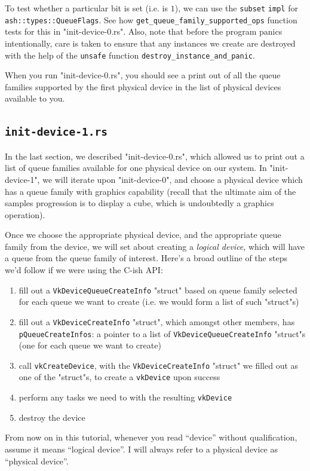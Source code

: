 \documentclass[12pt,letterpaper]{article}
\newcommand{\inquotes}[1]{``#1''}	%
\newcommand{\ril}[1]{\texttt{#1}}
\newcommand{\cil}[1]{\texttt{#1}}
\begin{document}
		To test whether a particular bit is set (i.e. is $1$), we can use the \ril{subset} \ril{impl} for \ril{ash::types::QueueFlags}. See how \ril{get_queue_family_supported_ops} function tests for this in "init-device-0.rs". Also, note that before the program panics intentionally, care is taken to ensure that any instances we create are destroyed with the help of the \ril{unsafe} function \ril{destroy_instance_and_panic}.
				
		When you run "init-device-0.rs", you should see a print out of all the queue families supported by the first physical device in the list of physical devices available to you. 
		
	\subsection{\texttt{init-device-1.rs}}
		In the last section, we described "init-device-0.rs", which allowed us to print out a list of queue families available for one physical device on our system. In "init-device-1", we will iterate upon "init-device-0", and choose a physical device which has a queue family with graphics capability (recall that the ultimate aim of the samples progression is to display a cube, which is undoubtedly a graphics operation).
		
		Once we choose the appropriate physical device, and the appropriate queue family from the device, we will set about creating a \emph{logical device}, which will have a queue from the queue family of interest. Here's a broad outline of the steps we'd follow if we were using the C-ish API:
			\begin{enumerate}
				\item fill out a \cil{VkDeviceQueueCreateInfo} "struct" based on queue family selected for each queue we want to create (i.e. we would form a list of such "struct"s)
				
				\item fill out a \cil{VkDeviceCreateInfo} "struct", which amongst other members, has \cil{pQueueCreateInfos}: a pointer to a list of \cil{VkDeviceQueueCreateInfo} "struct"s (one for each queue we want to create)
				
				\item call \cil{vkCreateDevice}, with the \cil{VkDeviceCreateInfo} "struct" we filled out as one of the "struct"s, to create a \cil{vkDevice} upon success
				
				\item perform any tasks we need to with the resulting \cil{vkDevice}
				
				\item destroy the device
			\end{enumerate}
		From now on in this tutorial, whenever you read \inquotes{device} without qualification, assume it means \inquotes{logical device}. I will always refer to a physical device as \inquotes{physical device}.
		
\end{document}
